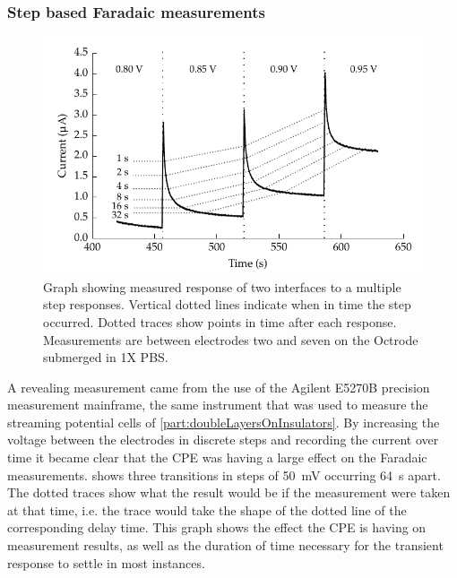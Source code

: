       \subsubsection*{Step based Faradaic measurements}
        \begin{figure}
          \centering
          \includegraphics{content/pt2/08-InterfaceParameters/graphics/graph_64s_stirred}
          \caption{\label{fig:pt2-faradaic_decay}Graph showing measured response of two interfaces to a multiple step responses. Vertical dotted lines indicate when in time the step occurred. Dotted traces show points in time after each response. Measurements are between electrodes two and seven on the Octrode submerged in 1X PBS.}
        \end{figure}

        A revealing measurement came from the use of the Agilent E5270B precision measurement mainframe, the same instrument that was used to measure the streaming potential cells of \cref{part:doubleLayersOnInsulators}.
        By increasing the voltage between the electrodes in discrete steps and recording the current over time it became clear that the CPE was having a large effect on the Faradaic measurements.
         shows three transitions in steps of \SI{50}{\milli\volt} occurring \SI{64}{\second} apart.
        The dotted traces show what the result would be if the measurement were taken at that time, i.e. the trace would take the shape of the dotted line of the corresponding delay time.
        This graph shows the effect the CPE is having on measurement results, as well as the duration of time necessary for the transient response to settle in most instances.

